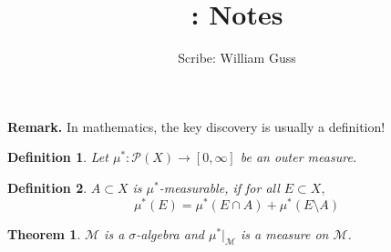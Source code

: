 \documentclass[letter]{article}
\title{\bCLASS: Notes }
\author{Scribe: William Guss}
\newtheorem{theorem}{Theorem}
\newtheorem{definition}{Definition}
\def\scriptm{{\mathcal M}}
\def\scriptp{{\mathcal P}}
\begin{document}
\maketitle
\thispagestyle{empty}
\noindent \textbf{Remark.} In mathematics, the key discovery is usually a definition!

\begin{definition}
	Let $\mu^*: \scriptp(X) \to [0,\infty]$ be an outer measure.
\end{definition}

\begin{definition}
	$A \subset X$ is $\mu^*$-measurable, if for all $E \subset X,$
	\begin{equation*}
		\mu^*(E) = \mu^*(E \cap A) + \mu^*(E \setminus A)
	\end{equation*}
\end{definition}

\begin{theorem}
	$\scriptm$ is a $\sigma$-algebra and $\mu^*|_\scriptm$ is a measure on $\scriptm$.
\end{theorem}
\end{document}

